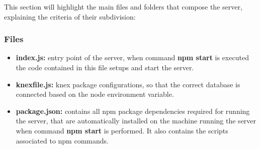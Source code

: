 This section will highlight the main files and folders that compose the server, explaining the criteria of their subdivision:

\subsubsection{Files}
\begin{itemize}
	\item \textbf{index.js:} entry point of the server, when command \textbf{npm start} is executed the code contained in this file setups and start the server.
	\item \textbf{knexfile.js:} knex package configurations, so that the correct database is connected based on the node environment variable.
	\item \textbf{package.json:} contains all npm package dependencies required for running the server, that are automatically installed on the machine running the server when command \textbf{npm start} is performed. It also contains the scripts associated to npm commands.
\end{itemize}

